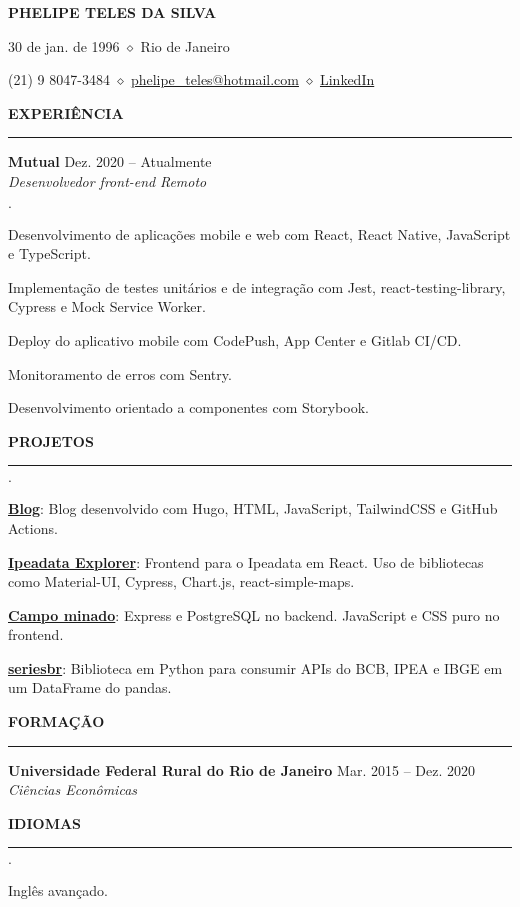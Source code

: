 \documentclass[11pt,letterpaper]{article}
\newenvironment{tightlist}
  {\begin{list}
    {$\cdot$}
    {
      \setlength{\leftmargin}{0em}
      \setlength{\itemsep}{-0.5em}
    }
  }
{\end{list}}
\begin{document}
\centerline{\huge\bf PHELIPE TELES DA SILVA}
\medskip

\centerline{30 de jan. de 1996 $\diamond$ Rio de Janeiro}
\smallskip

\centerline{
  (21) 9 8047-3484 $\diamond$
  \href{mailto:phelipe_teles@hotmail.com}{phelipe\_teles@hotmail.com} $\diamond$ \href{https://linkedin.com/in/phelipeteles}{LinkedIn}
}
\smallskip

\medskip \textbf{EXPERIÊNCIA} \medskip
\hrule

\textbf{Mutual} \hfill Dez. 2020 -- Atualmente \\
\emph{Desenvolvedor front-end} \hfill \emph{Remoto}

\begin{tightlist}
  \item Desenvolvimento de aplicações mobile e web com React, React Native,
    JavaScript e TypeScript.
  \item Implementação de testes unitários e de integração com Jest,
    react-testing-library, Cypress e Mock Service Worker.
  \item Deploy do aplicativo mobile com CodePush, App Center e Gitlab CI/CD.
  \item Monitoramento de erros com Sentry.
  \item Desenvolvimento orientado a componentes com Storybook.
\end{tightlist}

\medskip \textbf{PROJETOS} \medskip
\hrule

\begin{tightlist}
 \item \href{https://phelipetls.github.io}{\textbf{Blog}}: Blog desenvolvido com
   Hugo, HTML, JavaScript, TailwindCSS e GitHub Actions.
 \item \href{http://ipeadata-explorer.surge.sh}{\textbf{Ipeadata Explorer}}:
   Frontend para o Ipeadata em React. Uso de bibliotecas como Material-UI,
   Cypress, Chart.js, react-simple-maps.
 \item \href{https://github.com/phelipetls/minesweeper.js}{\textbf{Campo minado}}:
   Express e PostgreSQL no backend. JavaScript e CSS puro no frontend.
 \item \href{https://github.com/phelipetls/seriesbr}{\textbf{seriesbr}}:
   Biblioteca em Python para consumir APIs do BCB, IPEA e IBGE em um DataFrame
   do pandas.
\end{tightlist}

\medskip \textbf{FORMAÇÃO} \medskip
\hrule

\textbf{Universidade Federal Rural do Rio de Janeiro} \hfill {Mar. 2015 -- Dez. 2020} \\
\emph{Ciências Econômicas} \hfill

\medskip \textbf{IDIOMAS} \medskip
\hrule

\begin{tightlist}
  \item Inglês avançado.
\end{tightlist}
\end{document}
